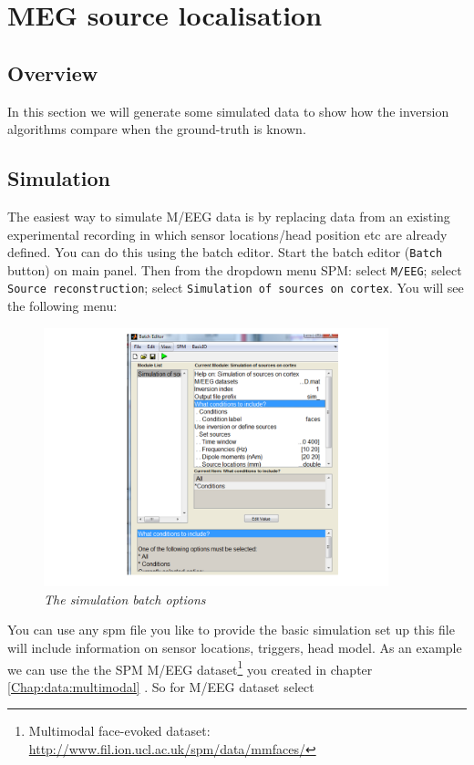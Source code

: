 \chapter{MEG source localisation\label{Chap:data:sloc}}


\section{Overview}
In this section we will generate some simulated data to show how the inversion algorithms compare when the ground-truth is known. 

\section{Simulation}
The easiest way to simulate M/EEG data is by replacing data from an existing experimental recording in which sensor locations/head position etc are already defined. You can do this using the batch editor. Start the batch editor (\texttt{Batch} button) on main panel. Then from the dropdown menu SPM: select \texttt{M/EEG}; select \texttt{Source reconstruction}; select \texttt{Simulation of sources on cortex}.
You will see the following menu:

\begin{figure}
\begin{center}
\includegraphics[width=100mm]{meg_sloc/slide1}
\caption{\em The simulation batch options} \label{meg_sloc:fig:1}
\end{center}
\end{figure}

You can use any spm file you like to provide the basic simulation set up this file will include information on sensor locations, triggers, head model. As an example we can use the the SPM M/EEG dataset\footnote{Multimodal face-evoked dataset: \url{http://www.fil.ion.ucl.ac.uk/spm/data/mmfaces/}} you created in chapter \ref{Chap:data:multimodal} . So for M/EEG dataset select 

